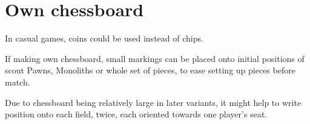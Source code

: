 \section*{Own chessboard}
\label{sec:Remarks/Own chessboard}

In casual games, coins could be used instead of chips.

If making own chessboard, small markings can be placed onto initial positions
of scout Pawns, Monoliths or whole set of pieces, to ease setting up pieces
before match.

Due to chessboard being relatively large in later variants, it might help to
write  position onto each field, twice, each oriented towards one
player's seat.

\clearpage %
